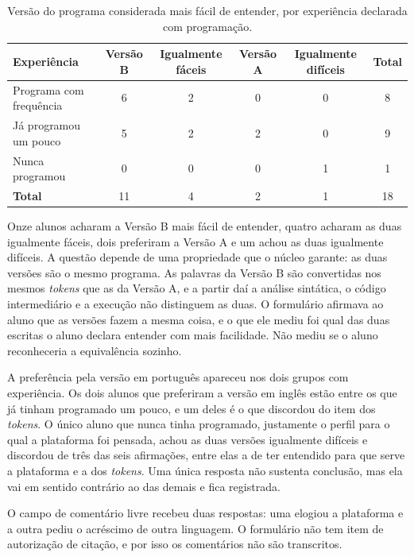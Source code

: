 \begin{table}[htbp]
\centering
\caption{Versão do programa considerada mais fácil de entender, por experiência declarada com programação.}
\label{tab:resultado-versoes}
\footnotesize
\renewcommand{\arraystretch}{1.2}
\begin{tabular}{|p{4.3cm}|c|c|c|c|c|}
\hline
\textbf{Experiência} & \textbf{Versão B} & \textbf{Igualmente fáceis} & \textbf{Versão A} & \textbf{Igualmente difíceis} & \textbf{Total} \\\hline
Programa com frequência & 6 & 2 & 0 & 0 & 8 \\\hline
Já programou um pouco & 5 & 2 & 2 & 0 & 9 \\\hline
Nunca programou & 0 & 0 & 0 & 1 & 1 \\\hline
\textbf{Total} & 11 & 4 & 2 & 1 & 18 \\\hline
\end{tabular}
\end{table}

Onze alunos acharam a Versão B mais fácil de entender, quatro acharam as duas igualmente fáceis, dois preferiram a Versão A e um achou as duas igualmente difíceis. A questão depende de uma propriedade que o núcleo garante: as duas versões são o mesmo programa. As palavras da Versão B são convertidas nos mesmos \textit{tokens} que as da Versão A, e a partir daí a análise sintática, o código intermediário e a execução não distinguem as duas. O formulário afirmava ao aluno que as versões fazem a mesma coisa, e o que ele mediu foi qual das duas escritas o aluno declara entender com mais facilidade. Não mediu se o aluno reconheceria a equivalência sozinho.

A preferência pela versão em português apareceu nos dois grupos com experiência. Os dois alunos que preferiram a versão em inglês estão entre os que já tinham programado um pouco, e um deles é o que discordou do item dos \textit{tokens}. O único aluno que nunca tinha programado, justamente o perfil para o qual a plataforma foi pensada, achou as duas versões igualmente difíceis e discordou de três das seis afirmações, entre elas a de ter entendido para que serve a plataforma e a dos \textit{tokens}. Uma única resposta não sustenta conclusão, mas ela vai em sentido contrário ao das demais e fica registrada.

O campo de comentário livre recebeu duas respostas: uma elogiou a plataforma e a outra pediu o acréscimo de outra linguagem. O formulário não tem item de autorização de citação, e por isso os comentários não são transcritos.

